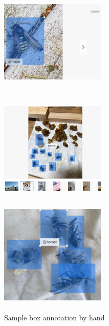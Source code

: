 \documentclass[12pt]{article}
\begin{document}
\begin{figure}[H]
	\small
	\centering
	\begin{minipage}{5cm}
		\includegraphics[width=5cm,height=5cm]{./pictures/hand1.png}
		\label{nt}
	\end{minipage}
	\begin{minipage}{5cm}
		\includegraphics[width=5cm,height=5cm]{./pictures/head2.png}
		\label{nt}
	\end{minipage}
	\begin{minipage}{5cm}
		\includegraphics[width=5cm,height=5cm]{./pictures/head3.png}
		\label{nt}
	\end{minipage}
	\caption{Sample box annotation by hand}
\end{figure}
\end{document}
